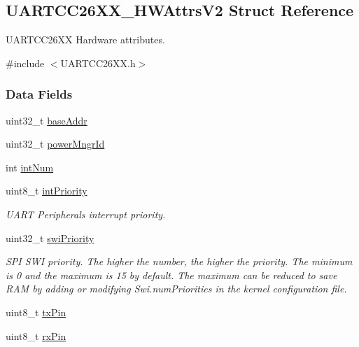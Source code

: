 \subsection{U\+A\+R\+T\+C\+C26\+X\+X\+\_\+\+H\+W\+Attrs\+V2 Struct Reference}
\label{struct_u_a_r_t_c_c26_x_x___h_w_attrs_v2}


U\+A\+R\+T\+C\+C26\+X\+X Hardware attributes.  




{\ttfamily \#include $<$U\+A\+R\+T\+C\+C26\+X\+X.\+h$>$}

\subsubsection*{Data Fields}
\begin{DoxyCompactItemize}
\item 
uint32\+\_\+t \hyperlink{struct_u_a_r_t_c_c26_x_x___h_w_attrs_v2_aba311f9c5938c83e262a0e5144013acc}{base\+Addr}
\item 
uint32\+\_\+t \hyperlink{struct_u_a_r_t_c_c26_x_x___h_w_attrs_v2_a4bb5070acbfb10be326b27ffd783ed2f}{power\+Mngr\+Id}
\item 
int \hyperlink{struct_u_a_r_t_c_c26_x_x___h_w_attrs_v2_a241735d20617487c5a12db2f481b4ddc}{int\+Num}
\item 
uint8\+\_\+t \hyperlink{struct_u_a_r_t_c_c26_x_x___h_w_attrs_v2_a154b4300357fcc365090a970b17aa67a}{int\+Priority}
\begin{DoxyCompactList}\small\item\em U\+A\+R\+T Peripheral\textquotesingle{}s interrupt priority. \end{DoxyCompactList}\item 
uint32\+\_\+t \hyperlink{struct_u_a_r_t_c_c26_x_x___h_w_attrs_v2_a6a8b6d625ad061be7e354ce1db08e86e}{swi\+Priority}
\begin{DoxyCompactList}\small\item\em S\+P\+I S\+W\+I priority. The higher the number, the higher the priority. The minimum is 0 and the maximum is 15 by default. The maximum can be reduced to save R\+A\+M by adding or modifying Swi.\+num\+Priorities in the kernel configuration file. \end{DoxyCompactList}\item 
uint8\+\_\+t \hyperlink{struct_u_a_r_t_c_c26_x_x___h_w_attrs_v2_a44ce413fed4b61b66f5155a4b90c2769}{tx\+Pin}
\item 
uint8\+\_\+t \hyperlink{struct_u_a_r_t_c_c26_x_x___h_w_attrs_v2_ab904bcffce2f8243d02af985809f6e65}{rx\+Pin}

\end{DoxyCompactItemize}
